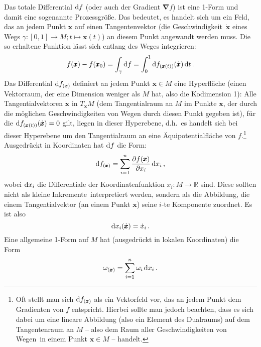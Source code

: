 Das totale Differential
${\rm d}f$ (oder auch der Gradient $\pmb{\nabla}f$) ist eine 1-Form und damit eine sogenannte Prozessgr\"o\ss e.
Das bedeutet, es handelt sich um ein Feld, das an jedem Punkt $\pmb{x}$ auf einen Tangentenvektor 
(die \glqq Geschwindigkeit\grqq\ $\dot{\pmb{x}}$ eines Wegs $\gamma:[0,1] \rightarrow M; t \mapsto \pmb{x}(t)$) an 
diesem Punkt angewandt werden muss. Die so erhaltene Funktion l\"asst sich entlang des Weges  integrieren:
\begin{equation}
         f(\pmb{x}) - f(\pmb{x}_0) =  \int_\gamma {\rm d}f = \int_0^1 {\rm d}f_{(\pmb{x}(t))}( \dot{\pmb{x}})\,{\rm d}t \, .
\end{equation}
Das Differential ${\rm d}f_{(\pmb{x})}$ definiert an jedem Punkt $\pmb{x}\in M$ eine Hyperfl\"ache (einen Vektorraum,
der eine Dimension weniger als $M$ hat, also die Kodimension 1):
Alle Tangentialvektoren $\dot{\pmb{x}}$ in $T_{\pmb{x}}M$ (dem Tangentialraum an $M$ im Punkte $\pmb{x}$, der
durch die m\"oglichen Geschwindigkeiten von Wegen durch diesen Punkt gegeben ist), 
f\"ur die ${\rm d}f_{(\pmb{x}(t))}( \dot{\pmb{x}})=0$ gilt, liegen in dieser Hyperebene, d.h.\ es handelt sich bei dieser 
Hyperebene um den Tangentialraum an 
eine \"Aquipotentialfl\"ache von $f$.\footnote{Oft stellt man sich ${\rm d}f_{(\pmb{x})}$ als ein Vektorfeld
vor, das an jedem Punkt dem Gradienten von $f$ entspricht. Hierbei sollte man jedoch beachten, dass es
sich dabei um eine lineare Abbildung (also ein Element des Dualraums) auf dem Tangentenraum an $M$ -- also
dem Raum aller \glqq Geschwindigkeiten von Wegen\grqq\ in einem Punkt $\pmb{x}\in M$ -- handelt.} 
Ausgedr\"uckt in Koordinaten hat ${\rm d}f$ die Form:
\begin{equation}
           {\rm d}f_{(\pmb{x})} = \sum_{i=1}^n \frac{\partial f(\pmb{x})}{\partial x_i}\, {\rm d} x_i \, ,
\end{equation}
wobei ${\rm d}x_i$ die Differentiale der Koordinatenfunktion $x_i:M\rightarrow \mathbb{R}$ sind. Diese
sollten nicht als \glqq kleine Inkremente\grqq\ interpretiert werden, sondern als die Abbildung, die einem
Tangentialvektor (an einem Punkt $\pmb{x}$) seine $i$-te Komponente zuordnet. Es ist also
\begin{equation}
                  {\rm d}x_i (\dot{\pmb{x}}) = \dot{x}_i \, . 
\end{equation}
Eine allgemeine 1-Form auf $M$ hat (ausgedr\"uckt in lokalen Koordinaten) die Form
\begin{equation}
           \omega_{(\pmb{x})} = \sum_{i=1}^n \omega_i \, {\rm d} x_i \, .
\end{equation}
